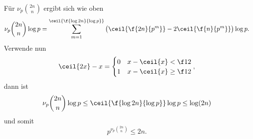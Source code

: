 \begin{nt} \label{7.6}
	Für $\nu_p \binom{2n}{n}$ ergibt sich wie oben
	\[
		\nu_p \binom {2n}{n} \log p = \sum_{m=1}^{\ceil{\f{\log 2n}{\log p}}} \big( \ceil{\f{2n}{p^m}} - 2 \ceil{\f{n}{p^m}} \big) \log p.
	\]
	Verwende nun
	\[
		\ceil{2x} - {x} = \begin{cases}
			0 & x - \ceil{x} < \f 12 \\
			1 & x - \ceil{x} \ge \f 12
		\end{cases},
	\]
	dann ist
	\[
		\nu_p \binom{2n}{n} \log p
		\le \ceil{\f {\log 2n}{\log p}}	 \log p
		\le \log(2n)
	\]
	und somit
	\begin{equation} \label{eq:7.6}
		p^{\nu_p \binom{2n}{n}} \le 2n.
		\tag{7.6}
	\end{equation}
\end{nt}
